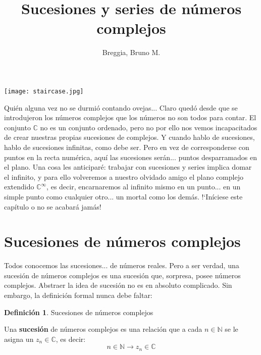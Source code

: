 \documentclass[12pt]{article}
\theoremstyle{definition}
\newtheorem{definition}{Definici\'on}[section]
\theoremstyle{theorem}
\theoremstyle{corolary}
\theoremstyle{method}
\begin{document}
	\title{Sucesiones y series de n\'umeros complejos}
	\author{Breggia, Bruno M.}
	\date{}
	\maketitle

\begin{center}
	\texttt{[image: staircase.jpg]}
\end{center}

Qui\'en alguna vez no se durmi\'o contando ovejas... Claro qued\'o desde que se introdujeron los n\'umeros complejos que los n\'umeros no son todos para contar. El conjunto $\mathbb{C}$ no es un conjunto ordenado, pero no por ello nos vemos incapacitados de crear nuestras propias sucesiones de complejos. Y cuando hablo de sucesiones, hablo de sucesiones infinitas, como debe ser. Pero en vez de corresponderse con puntos en la recta num\'erica, aqu\'i las sucesiones ser\'an... puntos desparramados en el plano. Una cosa les anticipar\'e: trabajar con sucesiones y series implica domar el infinito, y para ello volveremos a nuestro olvidado amigo el plano complejo extendido $\mathbb{C}^{\infty}$, es decir, encarnaremos al infinito mismo en un punto... en un simple punto como cualquier otro... un mortal como los dem\'as. !`In\'iciese este cap\'itulo o no se acabar\'a jam\'as!

\pagebreak
\tableofcontents
\pagebreak

\section{Sucesiones de n\'umeros complejos}
Todos conocemos las sucesiones... de n\'umeros reales. Pero a ser verdad, una sucesi\'on de n\'umeros complejos es una sucesi\'on que, sorpresa, posee n\'umeros complejos. Abstraer la idea de sucesi\'on no es en absoluto complicado. Sin embargo, la definici\'on formal nunca debe faltar:\\

\colorbox{violet!40!white!80}{\parbox{\linewidth}{
\theoremstyle{definition}
\begin{definition}{Sucesiones de n\'umeros complejos}

Una \textbf{sucesi\'on} de n\'umeros complejos es una relaci\'on que a cada $n\in \mathbb{N}$ se le asigna un $z_n \in \mathbb{C}$, es decir: $$n\in \mathbb{N} \rightarrow z_n\in \mathbb{C}$$

\end{definition}}}
\linebreak
\linebreak
\end{document}
